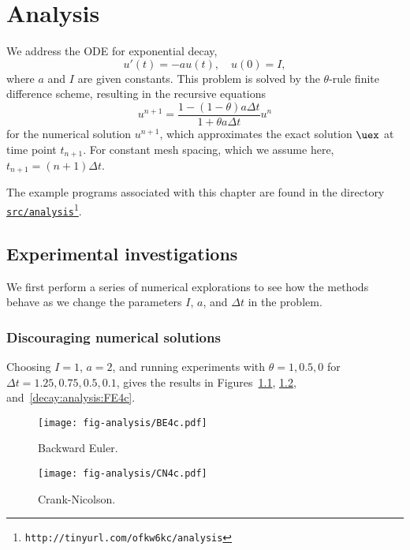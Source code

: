 \documentclass[graybox,sectrefs,envcountresetchap,open=right,final]{svmonodo}
\begin{document}
\chapter{Analysis}
\label{decay:analysis}

We address the ODE for exponential decay,
\begin{equation}
u'(t) = -au(t),\quad u(0)=I,
\end{equation}
where $a$ and $I$ are given constants. This problem is solved
by the $\theta$-rule finite difference scheme, resulting in
the recursive equations
\begin{equation}
u^{n+1} = \frac{1 - (1-\theta) a\Delta t}{1 + \theta a\Delta t}u^n
\label{decay:analysis:scheme}
\end{equation}
for the numerical solution $u^{n+1}$, which approximates the exact
solution $\uex$ at time point $t_{n+1}$. For constant mesh spacing,
which we assume here, $t_{n+1}=(n+1)\Delta t$.

The example programs associated with this chapter are found in
the directory \href{{http://tinyurl.com/ofkw6kc/analysis}}{\nolinkurl{src/analysis}\footnote{\texttt{http://tinyurl.com/ofkw6kc/analysis}}}.

\section{Experimental investigations}

We first perform a series of numerical explorations to see how the
methods behave as we change the parameters $I$, $a$, and $\Delta t$
in the problem.

\subsection{Discouraging numerical solutions}

Choosing $I=1$, $a=2$, and running experiments with $\theta =1,0.5, 0$
for $\Delta t=1.25, 0.75, 0.5, 0.1$, gives the results in
Figures~\ref{decay:analysis:BE4c}, \ref{decay:analysis:CN4c}, and~\ref{decay:analysis:FE4c}.

\begin{figure}[!ht]  %
  \centerline{\texttt{[image: fig-analysis/BE4c.pdf]}}
  \caption{
  Backward Euler. \label{decay:analysis:BE4c}
  }
\end{figure}

\begin{figure}[!ht]  %
  \centerline{\texttt{[image: fig-analysis/CN4c.pdf]}}
  \caption{
  Crank-Nicolson. \label{decay:analysis:CN4c}
  }
\end{figure}
\end{document}
